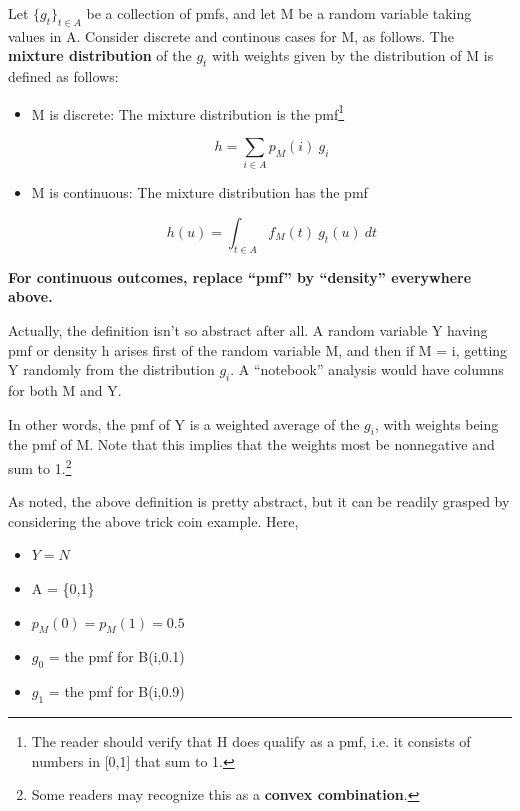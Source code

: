 \begin{definition} Let $\{g_t\}_{t \in A}$ be a collection of pmfs, and
let M be a random variable taking values in A.  Consider discrete and
continous cases for M, as follows.  The {\bf mixture distribution} of
the $g_t$ with weights given by the distribution of M is defined as
follows:

\begin{itemize}

\item M is discrete:  The mixture distribution is the pmf\footnote{The
reader should verify that H does qualify as a pmf, i.e. it consists of
numbers in [0,1] that sum to 1.}

\begin{equation}
\label{hsum}
h = \sum_{i \in A} p_M(i) ~ g_i
\end{equation}

\item M is continuous:  The mixture distribution has the pmf 

\begin{equation}
\label{continmix}
h(u) = \int_{t \in A} f_M(t)~  g_t(u) ~ dt
\end{equation}

\end{itemize}

{\bf For continuous outcomes, replace ``pmf'' by ``density'' everywhere
above.}

\end{definition}

\vskip 0.5in

Actually, the definition isn't so abstract after all.  A random variable
Y having pmf or density h arises first of the random variable M, and then if M
= i, getting Y randomly from the distribution $g_i$.  A ``notebook''
analysis would have columns for both M and Y.

In other words, the pmf of Y is a weighted average of the $g_i$, with
weights being the pmf of M.  Note that this implies that the weights
most be nonnegative and sum to 1.\footnote{Some readers may recognize
this as a {\bf convex combination}.}

As noted, the above definition is pretty abstract, but it can be readily
grasped by considering the above trick coin example.  Here,

\begin{itemize}

\item $Y = N$

\item A = \{0,1\}

\item $p_M(0) = p_M(1) = 0.5$

\item $g_0$ = the pmf for B(i,0.1)

\item $g_1$ = the pmf for B(i,0.9)

\end{itemize}

